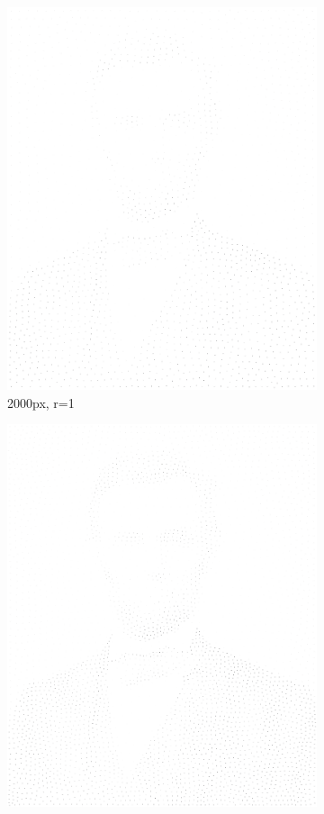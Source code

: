 \documentclass[11pt]{article}
\begin{document}
\begin{figure}[H]
\begin{subfigure}[b]{0.2\linewidth}
		\includegraphics[width=\linewidth]{pix/hc_AL_2000_r1.png}
		\caption{2000px, r=1}
	\end{subfigure}
	\begin{subfigure}[b]{0.2\linewidth}
		\includegraphics[width=\linewidth]{pix/hc_AL_4000_r1.png}

\end{subfigure}
\end{figure}
\end{document}
